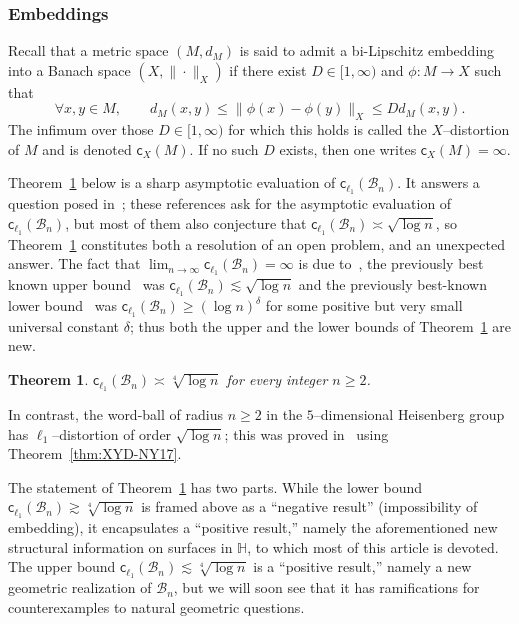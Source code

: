 \documentclass[11pt,reqno]{amsart}
\renewcommand{\H}{\mathbb{H}}
\newcommand{\cc}{{\mathsf{c}}}
\newcommand{\0}{\mathbf{0}}
\renewcommand{\1}{\mathbf 1}
\newcommand{\from}{\colon}
\renewcommand{\ge}{\geqslant}
\renewcommand{\le}{\leqslant}
\newtheorem{thm}{Theorem}[section]
\theoremstyle{remark}
\begin{document}
\subsubsection{Embeddings} Recall that a metric space $(M,d_M)$ is said to admit a bi-Lipschitz embedding into a Banach space $(X,\|\cdot\|_X)$ if there exist $D\in [1,\infty)$ and $\phi\from M\to X$ such that
\begin{equation}\label{eq:def D embedding}
\forall x,y\in M,\qquad d_M(x,y)\le \|\phi(x)-\phi(y)\|_X\le Dd_M(x,y).
\end{equation}
The infimum over those $D\in [1,\infty)$ for which this holds is called the $X$--distortion of $M$ and is denoted $\cc_X(M)$. If no such $D$ exists, then one writes $\cc_X(M)=\infty$.

Theorem~\ref{thm:sqrt4} below is a sharp asymptotic evaluation of $\cc_{\ell_1}(\mathcal{B}_n)$. It answers a question posed in~\cite{LN06,CK10,CheegerKleinerMetricDiff,CKN09,CKN,Nao10,Pan13,LafforgueNaor}; these references ask for the asymptotic evaluation of $\cc_{\ell_1}(\mathcal{B}_n)$, but most of them also conjecture that $\cc_{\ell_1}(\mathcal{B}_n)\asymp \sqrt{\log n}$, so Theorem~\ref{thm:sqrt4} constitutes both a resolution of an open problem, and an unexpected answer. The fact that $\lim_{n\to \infty}\cc_{\ell_1}(\mathcal{B}_n)=\infty$ is due to~\cite{CK10}, the previously best known upper bound~\cite{Ass83} was  $\cc_{\ell_1}(\mathcal{B}_n)\lesssim \sqrt{\log n}$ and the previously best-known lower bound~\cite{CKN} was $\cc_{\ell_1}(\mathcal{B}_n)\ge (\log n)^\delta$ for some positive but very small universal constant $\delta$; thus both the upper and the lower bounds of Theorem~\ref{thm:sqrt4} are new.

\begin{thm}\label{thm:sqrt4} $\cc_{\ell_1}(\mathcal{B}_n)\asymp \sqrt[4]{\log n}$ for every integer $n\ge 2$.
\end{thm}

In contrast, the word-ball of radius $n\ge 2$ in the $5$--dimensional Heisenberg group has $\ell_1$\nobreakdash--distortion of order $\sqrt{\log n}$; this was proved in~\cite{NY18} using Theorem~\ref{thm:XYD-NY17}.







The statement of Theorem~\ref{thm:sqrt4} has two parts. While the lower bound $\cc_{\ell_1}(\mathcal{B}_n)\gtrsim \sqrt[4]{\log n}$ is framed above as a ``negative result'' (impossibility of embedding), it encapsulates a ``positive result,'' namely the aforementioned new structural information on surfaces in $\H$, to which most of this article is devoted. The upper bound $\cc_{\ell_1}(\mathcal{B}_n)\lesssim \sqrt[4]{\log n}$ is a ``positive result,'' namely a new geometric realization of $\mathcal{B}_n$, but we will soon see that it has ramifications for counterexamples to  natural geometric questions.
\end{document}

